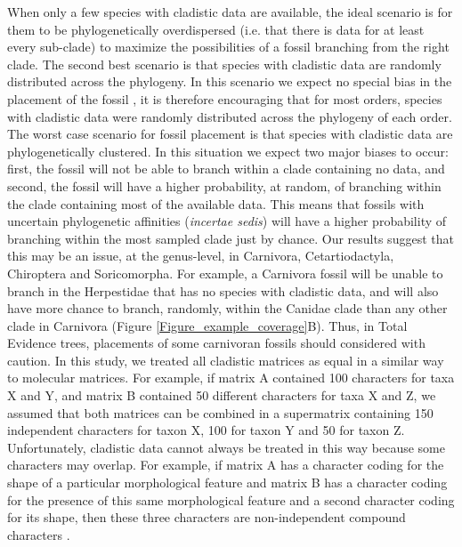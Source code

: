 \documentclass[12pt,letterpaper]{article}
\begin{document}
When only a few species with cladistic data are available, the ideal scenario is for them to be phylogenetically overdispersed (i.e. that there is data for at least every sub-clade) to maximize the possibilities of a fossil branching from the right clade.
The second best scenario is that species with cladistic data are randomly distributed across the phylogeny. 
In this scenario we expect no special bias in the placement of the fossil \citep{GuillermeCooper}, it is therefore encouraging that for most orders, species with cladistic data were randomly distributed across the phylogeny of each order.
The worst case scenario for fossil placement is that species with cladistic data are phylogenetically clustered. 
In this situation we expect two major biases to occur: first, the fossil will not be able to branch within a clade containing no data, and second, the fossil will have a higher probability, at random, of branching within the clade containing most of the available data.
This means that fossils with uncertain phylogenetic affinities (\textit{incertae sedis}) will have a higher probability of branching within the most sampled clade just by chance.
Our results suggest that this may be an issue, at the genus-level, in Carnivora, Cetartiodactyla, Chiroptera and Soricomorpha. 
For example, a Carnivora fossil will be unable to branch in the Herpestidae that has no species with cladistic data, and will also have more chance to branch, randomly, within the Canidae clade than any other clade in Carnivora (Figure \ref{Figure_example_coverage}B).
Thus, in Total Evidence trees, placements of some carnivoran fossils should considered with caution. 
In this study, we treated all cladistic matrices as equal in a similar way to molecular matrices. 
For example, if matrix A contained 100 characters for taxa X and Y, and matrix B contained 50 different characters for taxa X and Z, we assumed that both matrices can be combined in a supermatrix containing 150 independent characters for taxon X, 100 for taxon Y and 50 for taxon Z.
Unfortunately, cladistic data cannot always be treated in this way because some characters may overlap.
For example, if matrix A has a character coding for the shape of a particular morphological feature and matrix B has a character coding for the presence of this same morphological feature and a second character coding for its shape, then these three characters are non-independent compound characters \citep{Brazeau2011}.
\end{document}
